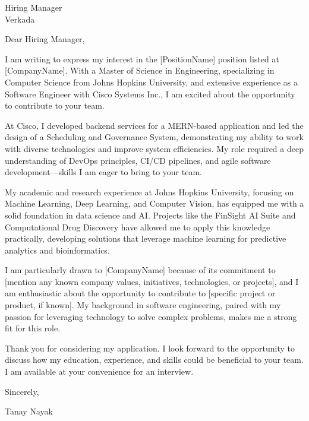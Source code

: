 \documentclass[11pt,a4paper]{letter}
\begin{document}
\begin{letter}{Hiring Manager\\Verkada}

\opening{Dear Hiring Manager,}

I am writing to express my interest in the [PositionName] position listed at [CompanyName]. With a Master of Science in Engineering, specializing in Computer Science from Johns Hopkins University, and extensive experience as a Software Engineer with Cisco Systems Inc., I am excited about the opportunity to contribute to your team.

At Cisco, I developed backend services for a MERN-based application and led the design of a Scheduling and Governance System, demonstrating my ability to work with diverse technologies and improve system efficiencies. My role required a deep understanding of DevOps principles, CI/CD pipelines, and agile software development—skills I am eager to bring to your team.

My academic and research experience at Johns Hopkins University, focusing on Machine Learning, Deep Learning, and Computer Vision, has equipped me with a solid foundation in data science and AI. Projects like the FinSight AI Suite and Computational Drug Discovery have allowed me to apply this knowledge practically, developing solutions that leverage machine learning for predictive analytics and bioinformatics.

I am particularly drawn to [CompanyName] because of its commitment to [mention any known company values, initiatives, technologies, or projects], and I am enthusiastic about the opportunity to contribute to [specific project or product, if known]. My background in software engineering, paired with my passion for leveraging technology to solve complex problems, makes me a strong fit for this role.

Thank you for considering my application. I look forward to the opportunity to discuss how my education, experience, and skills could be beneficial to your team. I am available at your convenience for an interview.

\closing{Sincerely,}

\hspace{1cm}Tanay Nayak

\end{letter}
\end{document}
